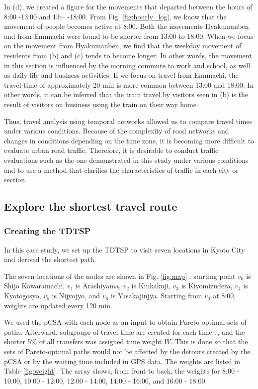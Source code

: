 \documentclass[conference]{IEEEtran}
\begin{document}
\par In (d), we created a figure for the movements that departed between the hours of 8:00 -13:00 and 13:-- -18:00.
From Fig. \ref{fig:hourly_log}, we know that the movement of people becomes active at 8:00.
Both the movements Hyakumanben and from Ennmachi were found to be shorter from 13:00 to 18:00.
When we focus on the movement from Hyakumanben, we find that the weekday movement of residents from (b) and (c) tends to become longer.
In other words, the movement in this section is influenced by the morning commute to work and school, as well as daily life and business activities.
If we focus on travel from Ennmachi, the travel time of approximately  20 min is more common between 13:00 and 18:00.
In other words, it can be inferred that the train travel by visitors seen in (b) is the result of visitors on business using the train on their way home.
\par Thus, travel analysis using temporal networks allowed us to compare travel times under various conditions.
Because of the complexity of road networks and changes in conditions depending on the time zone, it is becoming more difficult to evaluate urban road traffic.
Therefore, it is desirable to conduct traffic evaluations such as the one demonstrated in this study under various conditions and to use a method that clarifies the characteristics of traffic in each city or section.

\subsection{Explore the shortest travel route}
\subsubsection{Creating the TDTSP}
\label{sec:tdtsp}
\par In this case study, we set up the TDTSP to visit seven locations in Kyoto City and derived the shortest path.
\par The seven locations of the nodes are shown in Fig. \ref{fig:map} : starting point $v_0$ is Shijo Kawaramachi, $v_1$ is Arashiyama, $v_2$ is Kinkakuji, $v_3$ is Kiyomizudera, $v_4$ is Kyotogosyo, $v_5$ is Nijyojyo, and $v_6$ is Yasakajinjya.
Starting from $v_0$ at 8:00, weights are updated every 120 min.
\par We used the pCSA with each node as an input to obtain Pareto-optimal sets of paths.
Afterward, subgroups of travel time are created for each time $\tau$, and the shorter 5\% of all transfers was assigned time weight $W$.
This is done so that the sets of Pareto-optimal paths would not be affected by the detours created by the pCSA or by the waiting time included in GPS data.
The weights are listed in Table \ref{fig:weight}.
The array shows, from front to back, the weights for 8:00 - 10:00, 10:00 - 12:00, 12:00 - 14:00, 14:00 - 16:00, and 16:00 - 18:00.
\end{document}
